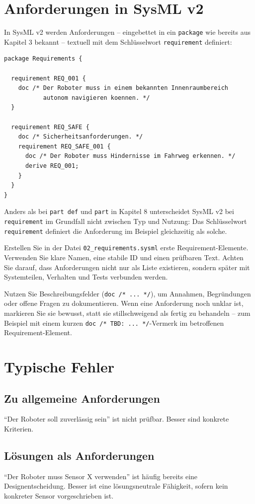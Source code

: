 \section{Anforderungen in SysML v2}
In SysML v2 werden Anforderungen – eingebettet in ein \texttt{package} wie bereits aus Kapitel 3 bekannt – textuell mit dem Schlüsselwort \texttt{requirement} definiert:

\begin{lstlisting}
package Requirements {

  requirement REQ_001 {
    doc /* Der Roboter muss in einem bekannten Innenraumbereich
           autonom navigieren koennen. */
  }

  requirement REQ_SAFE {
    doc /* Sicherheitsanforderungen. */
    requirement REQ_SAFE_001 {
      doc /* Der Roboter muss Hindernisse im Fahrweg erkennen. */
      derive REQ_001;
    }
  }
}
\end{lstlisting}

Anders als bei \texttt{part def} und \texttt{part} in Kapitel 8 unterscheidet SysML v2 bei \texttt{requirement} im Grundfall nicht zwischen Typ und Nutzung: Das Schlüsselwort \texttt{requirement} definiert die Anforderung im Beispiel gleichzeitig als solche.

Erstellen Sie in der Datei \texttt{02\_requirements.sysml} erste Requirement-Elemente. Verwenden Sie klare Namen, eine stabile ID und einen prüfbaren Text. Achten Sie darauf, dass Anforderungen nicht nur als Liste existieren, sondern später mit Systemteilen, Verhalten und Tests verbunden werden.

Nutzen Sie Beschreibungsfelder (\texttt{doc /* ... */}), um Annahmen, Begründungen oder offene Fragen zu dokumentieren. Wenn eine Anforderung noch unklar ist, markieren Sie sie bewusst, statt sie stillschweigend als fertig zu behandeln – zum Beispiel mit einem kurzen \texttt{doc /* TBD: ... */}-Vermerk im betroffenen Requirement-Element.

\section{Typische Fehler}
\subsection{Zu allgemeine Anforderungen}
\enquote{Der Roboter soll zuverlässig sein} ist nicht prüfbar. Besser sind konkrete Kriterien.

\subsection{Lösungen als Anforderungen}
\enquote{Der Roboter muss Sensor X verwenden} ist häufig bereits eine Designentscheidung. Besser ist eine lösungsneutrale Fähigkeit, sofern kein konkreter Sensor vorgeschrieben ist.

